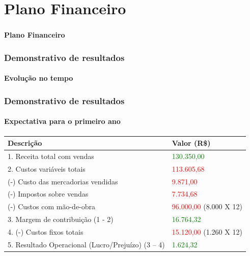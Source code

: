 \documentclass{beamer}
\begin{document}
\section{Plano Financeiro}
\begin{frame}
  \frametitle{}
  \framesubtitle{}

  \begin{center}
    {\huge\textbf{Plano Financeiro}}
  \end{center}
\end{frame}

\begin{frame}
  \frametitle{Demonstrativo de resultados}
  \framesubtitle{Evolução no tempo}

  \begin{center}
  \end{center}
\end{frame}

\begin{frame}
  \frametitle{Demonstrativo de resultados}
  \framesubtitle{Expectativa para o primeiro ano}

  \begin{small}
    \begin{tabular}{| l | l |}
      \hline
      \textbf{Descrição} & \textbf{Valor (R\$)}\\ \hline
      1. Receita total com vendas & \textcolor{green}{130.350,00}\\ \hline \hline
      2. Custos variáveis totais & \textcolor{red}{113.605,68}\\ \hline
      (-) Custo das mercadorias vendidas & \textcolor{red}{9.871,00}\\ \hline
      (-) Impostos sobre vendas & \textcolor{red}{7.734,68} \\ \hline
      (-) Custos com mão-de-obra & \textcolor{red}{96.000,00} (8.000 X 12)\\ \hline \hline
      3. Margem de contribuição (1 - 2) & \textcolor{green}{16.764,32}\\ \hline \hline
      4. (-) Custos fixos totais & \textcolor{red}{15.120,00} (1.260 X 12)\\ \hline \hline
      5. Resultado Operacional (Lucro/Prejuízo) (3 – 4) & \textcolor{green}{1.624,32}\\ \hline
    \end{tabular}
  \end{small}
\end{frame}
\end{document}
